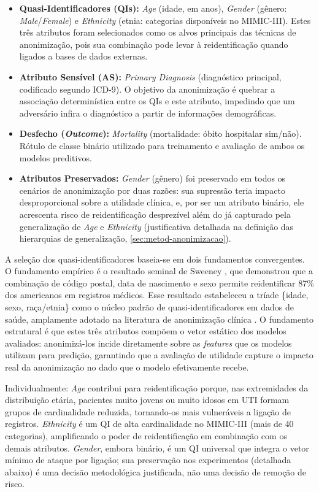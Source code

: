 \begin{itemize}
    \item \textbf{Quasi-Identificadores (QIs):} \textit{Age} (idade, em anos), \textit{Gender} (gênero: \textit{Male}/\textit{Female}) e \textit{Ethnicity} (etnia: categorias disponíveis no MIMIC-III). Estes três atributos foram selecionados como os alvos principais das técnicas de anonimização, pois sua combinação pode levar à reidentificação quando ligados a bases de dados externas.
    \item \textbf{Atributo Sensível (AS):} \textit{Primary Diagnosis} (diagnóstico principal, codificado segundo ICD-9). O objetivo da anonimização é quebrar a associação determinística entre os QIs e este atributo, impedindo que um adversário infira o diagnóstico a partir de informações demográficas.
    \item \textbf{Desfecho (\textit{Outcome}):} \textit{Mortality} (mortalidade: óbito hospitalar sim/não). Rótulo de classe binário utilizado para treinamento e avaliação de ambos os modelos preditivos.
    \item \textbf{Atributos Preservados:} \textit{Gender} (gênero) foi preservado em todos os cenários de anonimização por duas razões: sua supressão teria impacto desproporcional sobre a utilidade clínica, e, por ser um atributo binário, ele acrescenta risco de reidentificação desprezível além do já capturado pela generalização de \textit{Age} e \textit{Ethnicity} (justificativa detalhada na definição das hierarquias de generalização, \autoref{sec:metod-anonimizacao}).
\end{itemize}

A seleção dos quasi-identificadores baseia-se em dois fundamentos convergentes. O fundamento empírico é o resultado seminal de Sweeney \cite{Sweeney2002}, que demonstrou que a combinação de código postal, data de nascimento e sexo permite reidentificar 87\% dos americanos em registros médicos. Esse resultado estabeleceu a tríade \{idade, sexo, raça/etnia\} como o núcleo padrão de quasi-identificadores em dados de saúde, amplamente adotado na literatura de anonimização clínica \cite{ElEmam2013, Lee2017, Olatunji2024}. O fundamento estrutural é que estes três atributos compõem o vetor estático dos modelos avaliados: anonimizá-los incide diretamente sobre as \textit{features} que os modelos utilizam para predição, garantindo que a avaliação de utilidade capture o impacto real da anonimização no dado que o modelo efetivamente recebe.

Individualmente: \textit{Age} contribui para reidentificação porque, nas extremidades da distribuição etária, pacientes muito jovens ou muito idosos em UTI formam grupos de cardinalidade reduzida, tornando-os mais vulneráveis a ligação de registros. \textit{Ethnicity} é um QI de alta cardinalidade no MIMIC-III (mais de 40 categorias), amplificando o poder de reidentificação em combinação com os demais atributos. \textit{Gender}, embora binário, é um QI universal que integra o vetor mínimo de ataque por ligação; sua preservação nos experimentos (detalhada abaixo) é uma decisão metodológica justificada, não uma decisão de remoção de risco.

